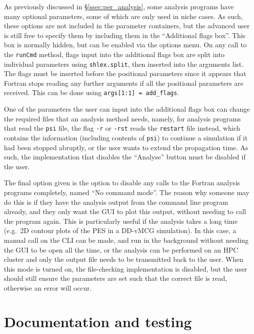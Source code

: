 \documentclass[12pt]{article}
\begin{document}
As previously discussed in \S\ref{ssec:per_analysis}, some analysis programs have many optional parameters, some of which are only used in niche cases. As such, these options are not included in the parameter containers, but the advanced user is still free to specify them by including them in the ``Additional flags box''. This box is normally hidden, but can be enabled via the options menu. On any call to the \texttt{runCmd} method, flags input into the additional flags box are split into individual parameters using \texttt{shlex.split}, then inserted into the arguments list. The flags must be inserted before the positional parameters since it appears that Fortran stops reading any further arguments if all the positional parameters are received. This can be done using \texttt{args[1:1] = add_flags}.

One of the parameters the user can input into the additional flags box can change the required files that an analysis method needs, namely, for analysis programs that read the \texttt{psi} file, the flag \texttt{-r} or \texttt{-rst} reads the \texttt{restart} file instead, which contains the information (including contents of \texttt{psi}) to continue a simulation if it had been stopped abruptly, or the user wants to extend the propagation time. As such, the implementation that disables the ``Analyse'' button must be disabled if the user.

The final option given is the option to disable any calls to the Fortran analysis programs completely, named ``No command mode''. The reason why someone may do this is if they have the analysis output from the command line program already, and they only want the GUI to plot this output, without needing to call the program again. This is particularly useful if the analysis takes a long time (e.g.~2D contour plots of the PES in a DD-vMCG simulation). In this case, a manual call on the CLI can be made, and run in the background without needing the GUI to be open all the time, or the analysis can be performed on an HPC cluster and only the output file needs to be transmitted back to the user. When this mode is turned on, the file-checking implementation is disabled, but the user should still ensure the parameters are set such that the correct file is read, otherwise an error will occur.

\section{Documentation and testing}\label{sec:doc_test}
\end{document}
